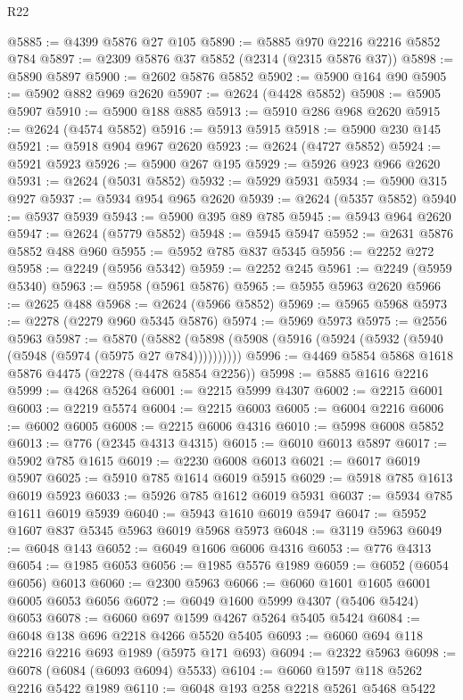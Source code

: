 \begin{lexlean}{R22}
\begin{coremodule}
@5885 := @4399 @5876 @27 @105
@5890 := @5885 @970 @2216 @2216 @5852 @784
@5897 := @2309 @5876 @37 @5852 (@2314 (@2315 @5876 @37))
@5898 := @5890 @5897
@5900 := @2602 @5876 @5852
@5902 := @5900 @164 @90
@5905 := @5902 @882 @969 @2620
@5907 := @2624 (@4428 @5852)
@5908 := @5905 @5907
@5910 := @5900 @188 @885
@5913 := @5910 @286 @968 @2620
@5915 := @2624 (@4574 @5852)
@5916 := @5913 @5915
@5918 := @5900 @230 @145
@5921 := @5918 @904 @967 @2620
@5923 := @2624 (@4727 @5852)
@5924 := @5921 @5923
@5926 := @5900 @267 @195
@5929 := @5926 @923 @966 @2620
@5931 := @2624 (@5031 @5852)
@5932 := @5929 @5931
@5934 := @5900 @315 @927
@5937 := @5934 @954 @965 @2620
@5939 := @2624 (@5357 @5852)
@5940 := @5937 @5939
@5943 := @5900 @395 @89 @785
@5945 := @5943 @964 @2620
@5947 := @2624 (@5779 @5852)
@5948 := @5945 @5947
@5952 := @2631 @5876 @5852 @488 @960
@5955 := @5952 @785 @837 @5345
@5956 := @2252 @272
@5958 := @2249 (@5956 @5342)
@5959 := @2252 @245
@5961 := @2249 (@5959 @5340)
@5963 := @5958 (@5961 @5876)
@5965 := @5955 @5963 @2620
@5966 := @2625 @488
@5968 := @2624 (@5966 @5852)
@5969 := @5965 @5968
@5973 := @2278 (@2279 @960 @5345 @5876)
@5974 := @5969 @5973
@5975 := @2556 @5963
@5987 := @5870
    (@5882 (@5898 (@5908 (@5916 (@5924 (@5932 (@5940 (@5948 (@5974 (@5975 @27 @784))))))))))
@5996 := @4469 @5854 @5868 @1618 @5876 @4475 (@2278 (@4478 @5854 @2256))
@5998 := @5885 @1616 @2216
@5999 := @4268 @5264
@6001 := @2215 @5999 @4307
@6002 := @2215 @6001
@6003 := @2219 @5574
@6004 := @2215 @6003
@6005 := @6004 @2216
@6006 := @6002 @6005
@6008 := @2215 @6006 @4316
@6010 := @5998 @6008 @5852
@6013 := @776 (@2345 @4313 @4315)
@6015 := @6010 @6013 @5897
@6017 := @5902 @785 @1615
@6019 := @2230 @6008 @6013
@6021 := @6017 @6019 @5907
@6025 := @5910 @785 @1614 @6019 @5915
@6029 := @5918 @785 @1613 @6019 @5923
@6033 := @5926 @785 @1612 @6019 @5931
@6037 := @5934 @785 @1611 @6019 @5939
@6040 := @5943 @1610 @6019 @5947
@6047 := @5952 @1607 @837 @5345 @5963 @6019 @5968 @5973
@6048 := @3119 @5963
@6049 := @6048 @143
@6052 := @6049 @1606 @6006 @4316
@6053 := @776 @4313
@6054 := @1985 @6053
@6056 := @1985 @5576 @1989
@6059 := @6052 (@6054 @6056) @6013
@6060 := @2300 @5963
@6066 := @6060 @1601 @1605 @6001 @6005 @6053 @6056
@6072 := @6049 @1600 @5999 @4307 (@5406 @5424) @6053
@6078 := @6060 @697 @1599 @4267 @5264 @5405 @5424
@6084 := @6048 @138 @696 @2218 @4266 @5520 @5405
@6093 := @6060 @694 @118 @2216 @2216 @693 @1989 (@5975 @171 @693)
@6094 := @2322 @5963
@6098 := @6078 (@6084 (@6093 @6094) @5533)
@6104 := @6060 @1597 @118 @5262 @2216 @5422 @1989
@6110 := @6048 @193 @258 @2218 @5261 @5468 @5422

\end{coremodule}
\end{lexlean}

